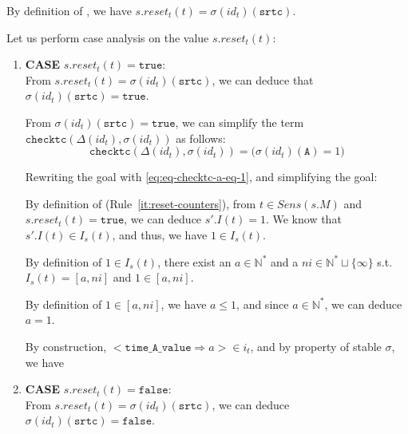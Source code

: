 \documentclass[dvipsnames,12pt]{article}
\begin{document}
\begin{niproof}
\begin{enumerate}
\begin{enumerate}
      By definition of \upSim, we have
      $s.reset_t(t)=\sigma(id_t)(\texttt{srtc})$.

      Let us perform case analysis on the value
      $s.reset_t(t)$:

      \begin{enumerate}
      \item \textbf{CASE} $s.reset_t(t)=\mathtt{true}$: \\

        From $s.reset_t(t)=\sigma(id_t)(\texttt{srtc})$, we can deduce that
        $\sigma(id_t)(\texttt{srtc})=\mathtt{true}$.

        From $\sigma(id_t)(\texttt{srtc})=\mathtt{true}$, we can
        simplify the term
        $\mathtt{checktc}(\Delta(id_t),\sigma(id_t))$ as follows:
        \begin{equation}
          \label{eq:eq-checktc-a-eq-1}
            \mathtt{checktc}(\Delta(id_t),\sigma(id_t))=\big(\sigma(id_t)(\texttt{A})=1\big)
        \end{equation}

        Rewriting the goal with \eqref{eq:eq-checktc-a-eq-1}, and
        simplifying the goal: 

        By definition of \dwSitpn{} (Rule~\ref{it:reset-counters}), from
        $t\in{}Sens(s.M)$ and $s.reset_t(t)=\mathtt{true}$, we can
        deduce $s'.I(t)=1$. We know that $s'.I(t)\in{}I_s(t)$, and
        thus, we have $1\in{}I_s(t)$.

        By definition of $1\in{}I_s(t)$, there exist an
        $a\in\mathbb{N}^{*}$ and a
        $ni\in{}\mathbb{N}^{*}\sqcup\{\infty\}$ s.t. $I_s(t)=[a,ni]$
        and $1\in[a,ni]$.

        By definition of $1\in[a,ni]$, we have $a\le{}1$, and
        since $a\in\mathbb{N}^{*}$, we can deduce $a=1$.

        By construction,
        ${<}\mathtt{time\_A\_value\Rightarrow}{}a{>}\in{}i_t$, and
        by property of stable $\sigma$, we have

      \item \textbf{CASE} $s.reset_t(t)=\mathtt{false}$: \\

        From $s.reset_t(t)=\sigma(id_t)(\texttt{srtc})$, we can deduce
        $\sigma(id_t)(\texttt{srtc})=\mathtt{false}$.


\end{enumerate}
\end{enumerate}
\end{enumerate}
\end{niproof}
\end{document}
